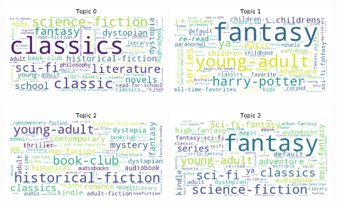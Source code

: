 \documentclass[handout]{beamer}
\begin{document}
\begin{frame}
\centering
  \includegraphics[width=0.45\textwidth]{../image/goodreads-topics-profiles-recommendations/tag-cloud-10-0.png} \hfill
    \includegraphics[width=0.45\textwidth]{../image/goodreads-topics-profiles-recommendations/tag-cloud-10-1.png}
    \vfill
    
      \includegraphics[width=0.45\textwidth]{../image/goodreads-topics-profiles-recommendations/tag-cloud-10-2.png} \hfill
        \includegraphics[width=0.45\textwidth]{../image/goodreads-topics-profiles-recommendations/tag-cloud-10-3.png}
\end{frame}
\end{document}
